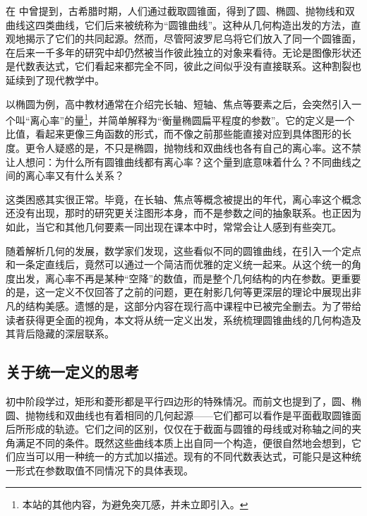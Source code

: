 
\begin{issues}
\issueDraft
\end{issues}


在 中曾提到，古希腊时期，人们通过截取圆锥面，得到了圆、椭圆、抛物线和双曲线这四类曲线，它们后来被统称为“圆锥曲线”。这种从几何构造出发的方法，直观地揭示了它们的共同起源。然而，尽管阿波罗尼乌将它们放入了同一个圆锥面，在后来一千多年的研究中却仍然被当作彼此独立的对象来看待。无论是图像形状还是代数表达式，它们看起来都完全不同，彼此之间似乎没有直接联系。这种割裂也延续到了现代教学中。

以椭圆为例，高中教材通常在介绍完长轴、短轴、焦点等要素之后，会突然引入一个叫“离心率”的量\footnote{本站的其他内容，为避免突兀感，并未立即引入。}，并简单解释为“衡量椭圆扁平程度的参数”。它的定义是一个比值，看起来更像三角函数的形式，而不像之前那些能直接对应到具体图形的长度。更令人疑惑的是，不只是椭圆，抛物线和双曲线也各有自己的离心率。这不禁让人想问：为什么所有圆锥曲线都有离心率？这个量到底意味着什么？不同曲线之间的离心率又有什么关系？

这类困惑其实很正常。毕竟，在长轴、焦点等概念被提出的年代，离心率这个概念还没有出现，那时的研究更关注图形本身，而不是参数之间的抽象联系。也正因为如此，当它和其他几何要素一同出现在课本中时，常常会让人感到有些突兀。

随着解析几何的发展，数学家们发现，这些看似不同的圆锥曲线，在引入一个定点和一条定直线后，竟然可以通过一个简洁而优雅的定义统一起来。从这个统一的角度出发，离心率不再是某种“空降”的数值，而是整个几何结构的内在参数。更重要的是，这一定义不仅回答了之前的问题，更在射影几何等更深层的理论中展现出非凡的结构美感。遗憾的是，这部分内容在现行高中课程中已被完全删去。为了带给读者获得更全面的视角，本文将从统一定义出发，系统梳理圆锥曲线的几何构造及其背后隐藏的深层联系。


\subsection{关于统一定义的思考}

初中阶段学过，矩形和菱形都是平行四边形的特殊情况。而前文也提到了，圆、椭圆、抛物线和双曲线也有着相同的几何起源——它们都可以看作是平面截取圆锥面后所形成的轨迹。它们之间的区别，仅仅在于截面与圆锥的母线或对称轴之间的夹角满足不同的条件。既然这些曲线本质上出自同一个构造，便很自然地会想到，它们应当可以用一种统一的方式加以描述。现有的不同代数表达式，可能只是这种统一形式在参数取值不同情况下的具体表现。

